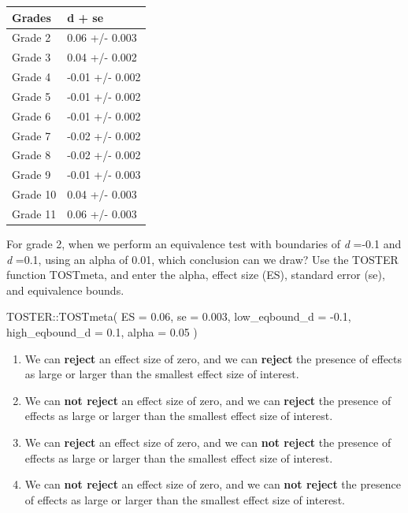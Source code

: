 \documentclass[
  oneside]{book}
\newenvironment{Shaded}{\begin{snugshade}}{\end{snugshade}}
\newcommand{\AttributeTok}[1]{\textcolor[rgb]{0.77,0.63,0.00}{#1}}
\newcommand{\FloatTok}[1]{\textcolor[rgb]{0.00,0.00,0.81}{#1}}
\newcommand{\FunctionTok}[1]{\textcolor[rgb]{0.00,0.00,0.00}{#1}}
\newcommand{\NormalTok}[1]{#1}
\newcommand{\SpecialCharTok}[1]{\textcolor[rgb]{0.00,0.00,0.00}{#1}}
\providecommand{\tightlist}{%
  \setlength{\itemsep}{0pt}\setlength{\parskip}{0pt}}
\begin{document}
\begin{longtable}[]{@{}ll@{}}
\toprule
\textbf{Grades} & \textbf{d + se} \\
\midrule
\endhead
Grade 2 & 0.06 +/- 0.003 \\
Grade 3 & 0.04 +/- 0.002 \\
Grade 4 & -0.01 +/- 0.002 \\
Grade 5 & -0.01 +/- 0.002 \\
Grade 6 & -0.01 +/- 0.002 \\
Grade 7 & -0.02 +/- 0.002 \\
Grade 8 & -0.02 +/- 0.002 \\
Grade 9 & -0.01 +/- 0.003 \\
Grade 10 & 0.04 +/- 0.003 \\
Grade 11 & 0.06 +/- 0.003 \\
\bottomrule
\end{longtable}

For grade 2, when we perform an equivalence test with boundaries of \emph{d} =-0.1 and \emph{d} =0.1, using an alpha of 0.01, which conclusion can we draw? Use the TOSTER function TOSTmeta, and enter the alpha, effect size (ES), standard error (se), and equivalence bounds.

\begin{Shaded}
\begin{Highlighting}[]
\NormalTok{TOSTER}\SpecialCharTok{::}\FunctionTok{TOSTmeta}\NormalTok{(}
  \AttributeTok{ES =} \FloatTok{0.06}\NormalTok{,}
  \AttributeTok{se =} \FloatTok{0.003}\NormalTok{,}
  \AttributeTok{low\_eqbound\_d =} \SpecialCharTok{{-}}\FloatTok{0.1}\NormalTok{,}
  \AttributeTok{high\_eqbound\_d =} \FloatTok{0.1}\NormalTok{,}
  \AttributeTok{alpha =} \FloatTok{0.05}
\NormalTok{)}
\end{Highlighting}
\end{Shaded}

\begin{enumerate}
\def\labelenumi{\Alph{enumi})}
\tightlist
\item
  We can \textbf{reject} an effect size of zero, and we can \textbf{reject} the presence of effects as large or larger than the smallest effect size of interest.
\item
  We can \textbf{not reject} an effect size of zero, and we can \textbf{reject} the presence of effects as large or larger than the smallest effect size of interest.
\item
  We can \textbf{reject} an effect size of zero, and we can \textbf{not reject} the presence of effects as large or larger than the smallest effect size of interest.
\item
  We can \textbf{not reject} an effect size of zero, and we can \textbf{not reject} the presence of effects as large or larger than the smallest effect size of interest.
\end{enumerate}
\end{document}
